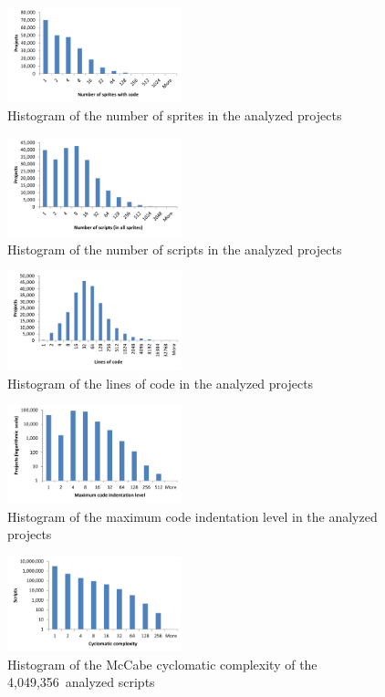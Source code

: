 \documentclass{sig-alternate}
\newcommand{\nscripts}{4,049,356}
\begin{document}
\begin{figure}
	\centering
	\includegraphics[width=0.45\textwidth]{fig/charts/1sprites}
	\caption{Histogram of the number of sprites in the analyzed projects}
	\label{fig:size-sprites}
\end{figure}
\begin{figure}
	\centering
	\includegraphics[width=0.45\textwidth]{fig/charts/1scripts}
	\caption{Histogram of the number of scripts in the analyzed projects}
	\label{fig:size-scripts}
\end{figure}
\begin{figure}
	\centering
	\includegraphics[width=0.45\textwidth]{fig/charts/1locs}
	\caption{Histogram of the lines of code in the analyzed projects}
	\label{fig:size-locs}
\end{figure}
\begin{figure}
	\centering
	\includegraphics[width=0.45\textwidth]{fig/charts/1indent}
	\caption{Histogram of the maximum code indentation level in the analyzed projects}
	\label{fig:size-indent}
\end{figure}
\begin{figure}
	\centering
	\includegraphics[width=0.45\textwidth]{fig/charts/3cyclomatic}
	\caption{Histogram of the McCabe cyclomatic complexity of the \nscripts~analyzed scripts}
	\label{fig:cyclomatic}
\end{figure}
\end{document}
